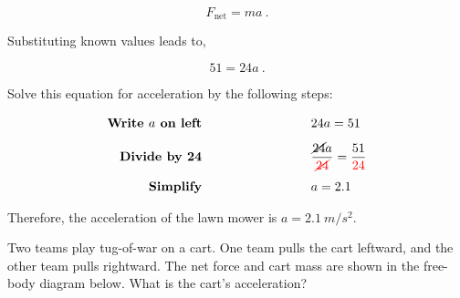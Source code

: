 \documentclass[main.tex]{subfiles}
\begin{document}
\begin{equation*}
    F_{\mathrm{net}} = ma\ .
\end{equation*}

Substituting known values leads to,

\begin{equation*}
    51 = 24 a\ .
\end{equation*}

Solve this equation for acceleration by the following steps:

\begin{align*}
    \textbf{Write $a$ on left} \hspace{9cm} 
    & \hspace{-6cm} 24 a = 51\\[1ex]
    \textbf{Divide by 24} \hspace{9cm}
    & \hspace{-6cm} \frac{\cancel{24}a}{\textcolor{red}{\cancel{24}}} = \frac{51}{\textcolor{red}{24}}\\[1ex]
    \textbf{Simplify} \hspace{9cm}
    & \hspace{-6cm} a = 2.1
\end{align*}

Therefore, the acceleration of the lawn mower is  $a = \SI{2.1}{m/s^2}$.

\solutionEnd

\begin{example} \label{ex:TugOWar} 
Two teams play tug-of-war on a cart. One team pulls the cart leftward, and the other team pulls rightward. The net force and cart mass are shown in the free-body diagram below. What is the cart's acceleration?
\end{example}

\begin{center}
\end{center}
\end{document}
